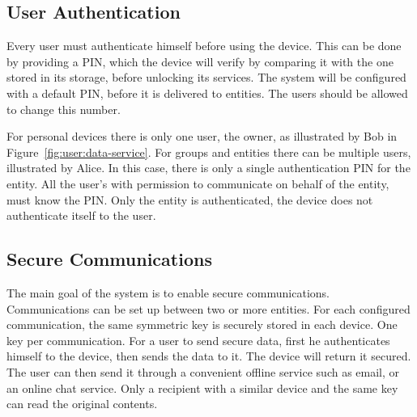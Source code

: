 \subsection{User Authentication}\label{chap:problem:scenarios:auth}

Every user must authenticate himself before using the device. This can be done by providing a PIN, which the device will verify by comparing it with the one stored in its storage, before unlocking its services.
The system will be configured with a default PIN, before it is delivered to entities. The users should be allowed to change this number.

For personal devices there is only one user, the owner, as illustrated by Bob in Figure~\ref{fig:user:data-service}. For groups and entities there can be multiple users, illustrated by Alice. In this case, there is only a single authentication PIN for the entity. All the user's with permission to communicate on behalf of the entity, must know the PIN.
Only the entity is authenticated, the device does not authenticate itself to the user.


\subsection{Secure Communications}\label{chap:problem:scenarios:comms}

The main goal of the system is to enable secure communications. Communications can be set up between two or more entities. For each configured communication, the same symmetric key is securely stored in each device. One key per communication.
For a user to send secure data, first he authenticates himself to the device, then sends the data to it. The device will return it secured. The user can then send it through a convenient offline service such as email, or an online chat service. Only a recipient with a similar device and the same key can read the original contents.


